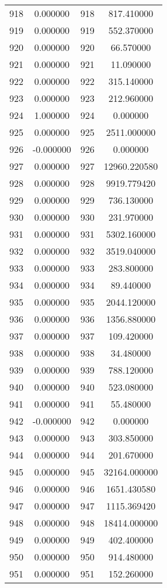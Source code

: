 \documentclass[12pt]{article}
\begin{document}
\begin{longtable}{@{}cccc@{}}
918 & 0.000000 & 918 & 817.410000 \\
919 & 0.000000 & 919 & 552.370000 \\
920 & 0.000000 & 920 & 66.570000 \\
921 & 0.000000 & 921 & 11.090000 \\
922 & 0.000000 & 922 & 315.140000 \\
923 & 0.000000 & 923 & 212.960000 \\
924 & 1.000000 & 924 & 0.000000 \\
925 & 0.000000 & 925 & 2511.000000 \\
926 & -0.000000 & 926 & 0.000000 \\
927 & 0.000000 & 927 & 12960.220580 \\
928 & 0.000000 & 928 & 9919.779420 \\
929 & 0.000000 & 929 & 736.130000 \\
930 & 0.000000 & 930 & 231.970000 \\
931 & 0.000000 & 931 & 5302.160000 \\
932 & 0.000000 & 932 & 3519.040000 \\
933 & 0.000000 & 933 & 283.800000 \\
934 & 0.000000 & 934 & 89.440000 \\
935 & 0.000000 & 935 & 2044.120000 \\
936 & 0.000000 & 936 & 1356.880000 \\
937 & 0.000000 & 937 & 109.420000 \\
938 & 0.000000 & 938 & 34.480000 \\
939 & 0.000000 & 939 & 788.120000 \\
940 & 0.000000 & 940 & 523.080000 \\
941 & 0.000000 & 941 & 55.480000 \\
942 & -0.000000 & 942 & 0.000000 \\
943 & 0.000000 & 943 & 303.850000 \\
944 & 0.000000 & 944 & 201.670000 \\
945 & 0.000000 & 945 & 32164.000000 \\
946 & 0.000000 & 946 & 1651.430580 \\
947 & 0.000000 & 947 & 1115.369420 \\
948 & 0.000000 & 948 & 18414.000000 \\
949 & 0.000000 & 949 & 402.400000 \\
950 & 0.000000 & 950 & 914.480000 \\
951 & 0.000000 & 951 & 152.260000 \\

\end{longtable}
\end{document}
